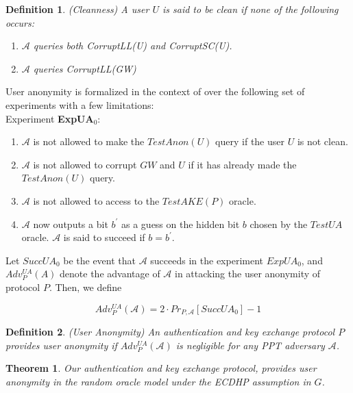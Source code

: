 \documentclass[a4paper,12pt]{report}
\newtheorem{theorem}{Theorem}
\newtheorem{definition}{Definition}
\begin{document}
\begin{definition}
(Cleanness) A user $U$ is said to be clean if none of the following occurs:
\begin{enumerate}
\item $\mathcal{A}$ queries both CorruptLL(U) and CorruptSC(U).
\item $\mathcal{A}$ queries CorruptLL(GW)
\end{enumerate}
\end{definition}
User anonymity is formalized  in the context of over the following set of experiments with a few limitations:\\
Experiment \textbf{ExpUA$_0$}:\\
\begin{enumerate}
\item $\mathcal{A}$ is not allowed to make the $TestAnon(U)$ query if the user $U$ is not clean.
\item $\mathcal{A}$ is not allowed to corrupt $GW$ and $U$ if it has already made the $TestAnon(U)$ query.
\item $\mathcal{A}$ is not allowed to access to the $TestAKE(P)$ oracle.
\item $\mathcal{A}$ now outputs a bit $b^{\prime}$ as a guess on the hidden bit $b$
chosen by the $TestUA$ oracle. $\mathcal{A}$ is said to succeed if $b = b^{\prime}$.
\end{enumerate}

Let $SuccUA_0$ be the event that $\mathcal{A}$ succeeds in the
experiment $ExpUA_0$, and $Adv^{UA}_{P}(A)$ denote the advantage of
$\mathcal{A}$ in attacking the user anonymity of protocol $P$. Then,
we define

\begin{equation}
Adv^{UA}_{P}(\mathcal{A}) = 2 \cdot Pr_{P, \mathcal{A}}[SuccUA_0]-1
\label{eq}
\end{equation}

\begin{definition}
(User Anonymity) An authentication and key exchange protocol $P$
provides user anonymity if $Adv^{UA}_P(\mathcal{A})$ is negligible
for any PPT adversary $\mathcal{A}$.
\end{definition}


\begin{theorem}\label{T1}
Our authentication and key exchange protocol, provides user anonymity in the
random oracle model under the \textit{ECDHP} assumption in $G$.
\end{theorem}
\end{document}
